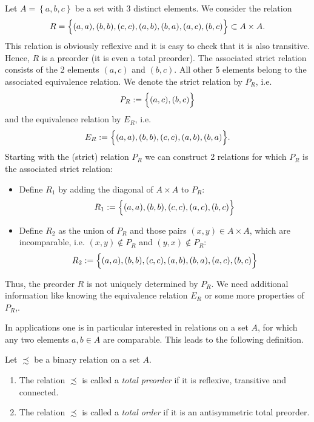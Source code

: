 ﻿\documentclass[a4paper,11pt,final]{article}
\numberwithin{equation}{subsection}
\begin{document}
\begin{exam}\label{reconstruct}
Let $A=\left\{a,b,c\right\}$ be a set with 3 distinct elements. We consider the relation
\begin{equation*}
R=\Bigl\{(a,a),(b,b),(c,c),(a,b),(b,a),(a,c),(b,c)\Bigr\}\subset A\times A.
\end{equation*}
This relation is obviously reflexive and it is easy to check that it is also transitive. Hence, $R$ is a preorder (it is even a total preorder). The associated strict relation consists of the 2 elements $(a,c)$ and $(b,c)$. All other 5 elements belong to the associated equivalence relation. We denote the strict relation by $P_R$, i.e.
\begin{equation*}
P_R:=\Bigl\{(a,c),(b,c)\Bigr\}
\end{equation*}
and the equivalence relation by $E_R$, i.e.
\begin{equation*}
E_R:=\Bigl\{(a,a),(b,b),(c,c),(a,b),(b,a)\Bigr\}.
\end{equation*}
Starting with the (strict) relation $P_R$ we can construct 2 relations for which $P_R$ is the associated strict relation:
\begin{itemize}
\item Define $R_1$ by adding the diagonal of $A\times A$ to $P_R$:
\begin{equation*}
R_1:=\Bigl\{(a,a),(b,b),(c,c),(a,c),(b,c)\Bigr\}
\end{equation*}
\item Define $R_2$ as the union of $P_R$ and those pairs $(x,y)\in A\times A$, which are incomparable, i.e. $(x,y)\notin P_R$ and $(y,x)\notin P_R$:
\begin{equation*}
R_2:=\Bigl\{(a,a),(b,b),(c,c),(a,b),(b,a),(a,c),(b,c)\Bigr\}
\end{equation*}
\end{itemize}
Thus, the preorder $R$ is not uniquely determined by $P_R$. We need additional information like knowing the equivalence relation $E_R$ or some more properties of $P_R$,.
\end{exam}

In applications one is in particular interested in relations on a set $A$, for which any two elements $a,b\in A$ are comparable. This leads to the following definition.
\begin{defi}
Let $\precsim$ be a binary relation on a set $A$.
\begin{enumerate}
\item The relation $\precsim$ is called a \emph{total preorder} if it is reflexive, transitive and connected.
\item The relation $\precsim$ is called a \emph{total order} if it is an antisymmetric total preorder.
\end{enumerate}
\end{defi}
\end{document}
